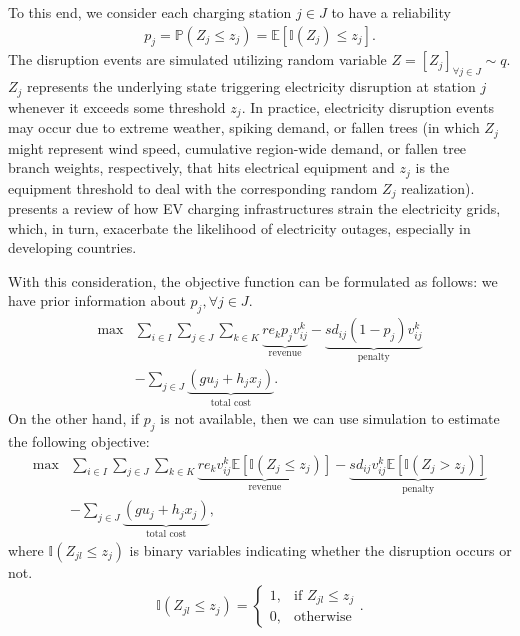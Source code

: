 \documentclass[preprint]{oscmjournal}
\theoremstyle{remark}
\begin{document}
To this end, we consider each charging station $j \in J$ to have a reliability 
\begin{align}
p_j = \mathbb P(Z_j \leq z_j) = \mathbb E [\mathbb I(Z_j) \leq z_j].
\end{align}
The disruption events are simulated utilizing random variable $Z = [Z_j]_{\forall j \in J} \sim q$. $Z_j$ represents the underlying state triggering electricity disruption at station $j$ whenever it exceeds some threshold $z_j$. In practice, electricity disruption events may occur due to extreme weather, spiking demand, or fallen trees \autocite{10causespoweroutages} (in which $Z_j$ might represent wind speed, cumulative region-wide demand, or fallen tree branch weights, respectively, that hits electrical equipment and $z_j$ is the equipment threshold to deal with the corresponding random $Z_j$ realization). \textcite{khalid2019comprehensive} presents a review of how EV charging infrastructures strain the electricity grids, which, in turn, exacerbate the likelihood of electricity outages, especially in developing countries. 

With this consideration, the objective function can be formulated as follows: we have prior information about $p_j, \forall j \in J$.
\begin{align}
\max &\sum_{i \in I} \sum_{j \in J} \sum_{k \in K} 
\underbrace{r e_k p_j  v_{ij}^k}_{\text{revenue}} - \underbrace{s d_{ij} (1-p_j)  v_{ij}^k}_{\text{penalty}}  \nonumber \\
&-  \sum_{j \in J} \underbrace{(g u_j + h_j x_j)}_{\text{total cost}}.
\label{obj}
\end{align}
On the other hand, if $p_j$ is not available, then we can use simulation to estimate the following objective:
\begin{align}
\max &\sum_{i \in I} \sum_{j \in J} \sum_{k \in K}
\underbrace{ r e_k v_{ij}^k  \mathbb E \left[\mathbb I(Z_{j} \leq z_j) \right]}_{\text{revenue}} - \underbrace{s d_{ij}  v_{ij}^k \mathbb E \left[\mathbb I(Z_{j} > z_j) \right]}_{\text{penalty}}  \nonumber \\
&-  \sum_{j \in J} \underbrace{(g u_j + h_j x_j)}_{\text{total cost}},
\label{obj_est}
\end{align}
where $\mathbb I(Z_{jl} \leq z_j)$ is binary variables indicating whether the disruption occurs or not.
\begin{align}
\mathbb I (Z_{jl} \leq z_j) = \begin{cases} 1, & \text{if } Z_{jl} \leq z_j \\ 0, &\text{otherwise}\end{cases}.
\end{align}
\end{document}
